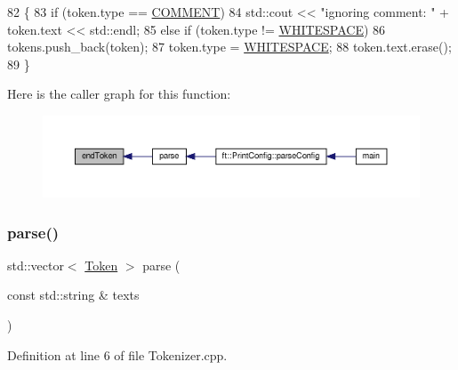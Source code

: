\begin{DoxyCode}
82     \{
83         \textcolor{keywordflow}{if} (token.type == \hyperlink{namespaceft_aa520fbf142ba1e7e659590c07da31921aae696377c19e507b64e16be78ce3bbdb}{COMMENT})
84             std::cout << \textcolor{stringliteral}{"ignoring comment: "} + token.text << std::endl;
85         \textcolor{keywordflow}{else} \textcolor{keywordflow}{if} (token.type != \hyperlink{namespaceft_aa520fbf142ba1e7e659590c07da31921aba113c37f25d24aada154b75c7dd91ba}{WHITESPACE})
86             tokens.push\_back(token);
87         token.type = \hyperlink{namespaceft_aa520fbf142ba1e7e659590c07da31921aba113c37f25d24aada154b75c7dd91ba}{WHITESPACE};
88         token.text.erase();
89     \}
\end{DoxyCode}
Here is the caller graph for this function\+:
\nopagebreak
\begin{figure}[H]
\begin{center}
\leavevmode
\includegraphics[width=350pt]{classft_1_1_tokenizer_a4d9a98ce2e5ef728cfa5a68c8f726587_icgraph}
\end{center}
\end{figure}
\mbox{\label{classft_1_1_tokenizer_a10bacfc70f3d74a0e04218c1df86f6c2}} 
\subsubsection{\texorpdfstring{parse()}{parse()}}
{\footnotesize\ttfamily std\+::vector$<$ \hyperlink{classft_1_1_token}{Token} $>$ parse (\begin{DoxyParamCaption}\item[{const std\+::string \&}]{texts }\end{DoxyParamCaption})}



Definition at line 6 of file Tokenizer.\+cpp.


